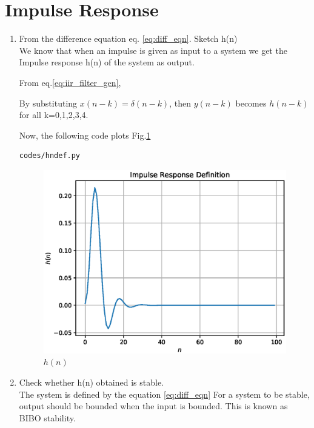 \documentclass[journal,12pt,twocolumn]{IEEEtran}
\renewcommand\thesection{\arabic{section}}
\begin{document}
\section{Impulse Response}
\begin{enumerate}[label=\thesection.\arabic*,ref=\thesection.\theenumi]
\item
From the difference equation eq. \ref{eq:diff_eqn}. Sketch h(n)
\label{prob:h(n)}
\\
\solution
We know that when an impulse is given as input to a system we get the Impulse response h(n) of the system as output.

From eq.\ref{eq:iir_filter_gen}, 

By substituting $x(n-k) = \delta(n-k)$, then $y(n-k)$ becomes $h(n-k)$ for all k=0,1,2,3,4.

Now, the following code plots Fig.\ref{fig:h(n)}
\begin{lstlisting}
codes/hndef.py
\end{lstlisting}
\begin{figure}[!ht]
\centering
\includegraphics[width=\columnwidth]{./figs/h(n).eps}
\caption{$h(n)$}
\label{fig:h(n)}
\end{figure}

\item Check whether h(n) obtained is stable.
\\
\solution
The system is defined by the equation \ref{eq:diff_eqn} 
For a system to be stable, output should be bounded when the input is bounded. This is known as BIBO stability.


\end{enumerate}
\end{document}
